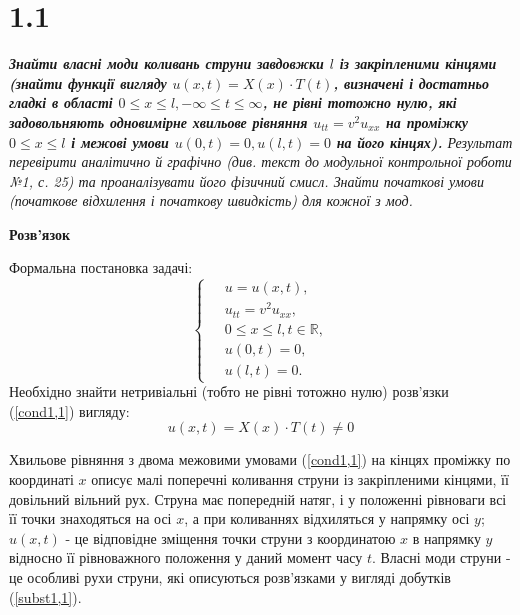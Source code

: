 

%

\section[Задача №1.1]{1.1}

\textit{\textbf{Знайти власні моди коливань струни завдовжки $l$ із закріпленими кінцями (знайти функції вигляду $u(x,t) = X(x) \cdot T(t)$, визначені і достатньо гладкі в області $0 \leq x \leq l, -\infty \leq t \leq \infty$, не рівні тотожно нулю, які задовольняють одновимірне хвильове рівняння $u_{tt} = v^2 u_{xx}$ на проміжку $0 \leq x \leq l$ і межові умови $u(0,t) = 0, u(l,t) = 0$ на його кінцях).} Результат перевірити аналітично й графічно (див. текст до модульної контрольної роботи №1, с. 25) та проаналізувати його фізичний смисл. Знайти початкові умови (початкове відхилення і початкову швидкість) для кожної з мод.}

\begin{center}
    \large{\textbf{Розв'язок}}
\end{center}

\noindent Формальна постановка задачі:
\begin{equation} \label{cond1,1}
    \left\{ \begin{aligned} %
        \;&u = u(x,t), \\
          &u_{tt} = v^2 u_{xx}, \\
          &0 \leq x \leq l, t \in \mathbb{R}, \\
          &u(0,t) = 0, \\
          &u(l,t) = 0. 
    \end{aligned} \right.
\end{equation}
Необхідно знайти нетривіальні (тобто не рівні тотожно нулю) розв'язки (\ref{cond1,1}) вигляду:
\begin{equation} \label{subst1,1}
    u(x,t) = X(x) \cdot T(t) \neq 0 
\end{equation}

Хвильове рівняння з двома межовими умовами (\ref{cond1,1}) на кінцях проміжку по координаті $x$ описує малі поперечні коливання струни із закріпленими кінцями, її довільний вільний рух. Струна має попередній натяг, і у положенні рівноваги  всі її точки знаходяться на осі $x$, а при коливаннях відхиляться у напрямку осі $y$; $u(x,t)$ - це відповідне зміщення точки струни з координатою $x$ в напрямку $y$ відносно її рівноважного положення у даний момент часу $t$. Власні моди струни - це особливі рухи струни, які описуються розв'язками у вигляді добутків (\ref{subst1,1}). 

